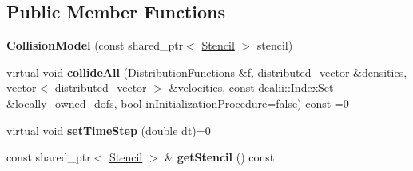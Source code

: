 \subsection*{Public Member Functions}
\begin{DoxyCompactItemize}
\item 
\hypertarget{classnatrium_1_1CollisionModel_a5e5254caec7f69000646886be11a34f8}{
{\bfseries CollisionModel} (const shared\_\-ptr$<$ \hyperlink{classnatrium_1_1Stencil}{Stencil} $>$ stencil)}
\label{classnatrium_1_1CollisionModel_a5e5254caec7f69000646886be11a34f8}

\item 
\hypertarget{classnatrium_1_1CollisionModel_ac6c6d95633d62209a04528af86807025}{
virtual void {\bfseries collideAll} (\hyperlink{classnatrium_1_1DistributionFunctions}{DistributionFunctions} \&f, distributed\_\-vector \&densities, vector$<$ distributed\_\-vector $>$ \&velocities, const dealii::IndexSet \&locally\_\-owned\_\-dofs, bool inInitializationProcedure=false) const =0}
\label{classnatrium_1_1CollisionModel_ac6c6d95633d62209a04528af86807025}

\item 
\hypertarget{classnatrium_1_1CollisionModel_aa0df0674bc26821d037323ac184fb52b}{
virtual void {\bfseries setTimeStep} (double dt)=0}
\label{classnatrium_1_1CollisionModel_aa0df0674bc26821d037323ac184fb52b}

\item 
\hypertarget{classnatrium_1_1CollisionModel_a482808bab1832ee06892630b8ead7dde}{
const shared\_\-ptr$<$ \hyperlink{classnatrium_1_1Stencil}{Stencil} $>$ \& {\bfseries getStencil} () const }
\label{classnatrium_1_1CollisionModel_a482808bab1832ee06892630b8ead7dde}


\end{DoxyCompactItemize}
